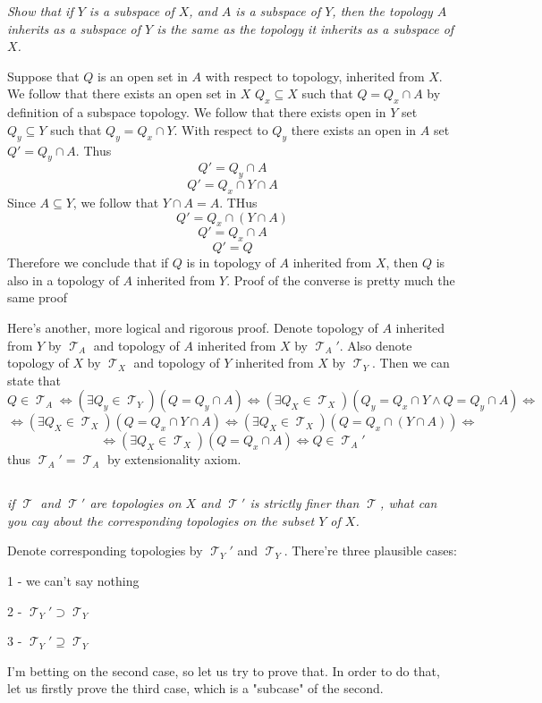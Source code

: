 \documentclass[11pt,oneside,titlepage]{book}
\DeclareMathOperator \topol {\mathcal {T}}
\DeclareMathOperator \lra {\Leftrightarrow}
\begin{document}
\textit{Show that if $Y$ is a subspace of $X$, and $A$ is a subspace of $Y$, then the topology
  $A$ inherits as a subspace of $Y$ is the same as the topology it
  inherits as a subspace of $X$.}



Suppose that $Q$ is an open set in $A$ with respect to topology, inherited from $X$.
We follow that there exists an open set in $X$  $Q_x \subseteq X$ such that $Q = Q_x \cap A$
by definition of a subspace topology. We follow that there exists open in $Y$ set $Q_y \subseteq Y$
such that $Q_y = Q_x \cap Y$. With respect to $Q_y$ there exists an open in $A$ set
$Q' = Q_y \cap A$. Thus
$$Q' = Q_y \cap A$$
$$Q' = Q_x \cap Y \cap A$$
Since $A \subseteq Y$, we follow that $Y \cap A = A$. THus
$$Q' = Q_x \cap (Y \cap A)$$
$$Q' = Q_x \cap A$$
$$Q' = Q$$
Therefore we conclude that if $Q$ is in topology of $A$ inherited from $X$, then $Q$ is also
in a topology of $A$ inherited from $Y$. Proof of the converse is pretty much the same
proof

Here's another, more logical and rigorous proof.
Denote topology of $A$ inherited from $Y$ by $\topol_A$ and topology of $A$ inherited from $X$
by $\topol_A'$. Also denote topology of $X$ by $\topol_X$ and topology of $Y$ inherited from $X$
by $\topol_Y$. Then we can state that 
$$Q \in \topol_A \lra (\exists Q_y \in \topol_Y)(Q = Q_y \cap A) \lra
(\exists Q_X \in \topol_X)(Q_y = Q_x \cap Y \land Q = Q_y \cap A) \lra$$
$$ \lra 
(\exists Q_X \in \topol_X)(Q = Q_x \cap Y  \cap A) \lra
(\exists Q_X \in \topol_X)(Q = Q_x \cap (Y  \cap A)) \lra
$$
$$ \lra 
(\exists Q_X \in \topol_X)(Q = Q_x \cap A) \lra
Q \in \topol_A'$$
thus $\topol_A' = \topol_A$ by extensionality axiom.

\subsection{}

\textit{if $\topol$ and $\topol'$ are topologies on $X$ and $\topol'$ is strictly finer
  than $\topol$, what can you cay about the corresponding topologies on the subset $Y$ of $X$.}

Denote corresponding topologies by $\topol_Y'$ and $\topol_Y$.
There're three plausible cases:

1 - we can't say nothing

2 - $\topol_Y' \supset \topol_Y$

3 - $\topol_Y' \supseteq \topol_Y$

I'm betting on the second case, so let us try to prove that. In order to do that, let us firstly
prove the third case, which is a "subcase" of the second.
\end{document}
